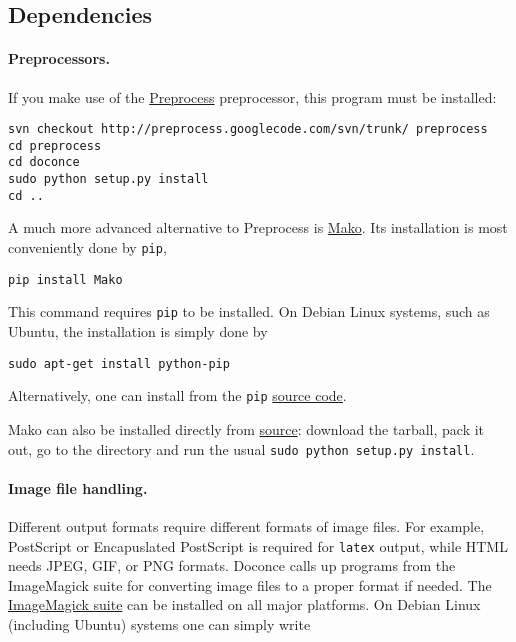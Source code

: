 \documentclass[%
oneside,                 %
final,                   %
10pt]{article}
\begin{document}
\subsection{Dependencies}

\paragraph{Preprocessors.}
If you make use of the \href{{http://code.google.com/p/preprocess}}{Preprocess}
preprocessor, this program must be installed:

\vspace{4pt}
\begin{Verbatim}[numbers=none,frame=lines,label=\fbox{{\tiny Terminal}},fontsize=\fontsize{9pt}{9pt},
labelposition=topline,framesep=2.5mm,framerule=0.7pt]
svn checkout http://preprocess.googlecode.com/svn/trunk/ preprocess
cd preprocess
cd doconce
sudo python setup.py install
cd ..
\end{Verbatim}

A much more advanced alternative to Preprocess is
\href{{http://www.makotemplates.org}}{Mako}. Its installation is most
conveniently done by {\fontsize{10pt}{10pt}\Verb!pip!},

\vspace{4pt}
\begin{Verbatim}[numbers=none,frame=lines,label=\fbox{{\tiny Terminal}},fontsize=\fontsize{9pt}{9pt},
labelposition=topline,framesep=2.5mm,framerule=0.7pt]
pip install Mako
\end{Verbatim}
This command requires {\fontsize{10pt}{10pt}\Verb!pip!} to be installed. On Debian Linux systems,
such as Ubuntu, the installation is simply done by

\vspace{4pt}
\begin{Verbatim}[numbers=none,frame=lines,label=\fbox{{\tiny Terminal}},fontsize=\fontsize{9pt}{9pt},
labelposition=topline,framesep=2.5mm,framerule=0.7pt]
sudo apt-get install python-pip
\end{Verbatim}
Alternatively, one can install from the {\fontsize{10pt}{10pt}\Verb!pip!} \href{{http://pypi.python.org/pypi/pip}}{source code}.

Mako can also be installed directly from
\href{{http://www.makotemplates.org/download.html}}{source}: download the
tarball, pack it out, go to the directory and run
the usual {\fontsize{10pt}{10pt}\Verb!sudo python setup.py install!}.

\paragraph{Image file handling.}
Different output formats require different formats of image files.
For example, PostScript or Encapuslated PostScript is required for {\fontsize{10pt}{10pt}\Verb!latex!}
output, while HTML needs JPEG, GIF, or PNG formats.
Doconce calls up programs from the ImageMagick suite for converting
image files to a proper format if needed. The \href{{http://www.imagemagick.org/script/index.php}}{ImageMagick suite} can be installed on all major platforms.
On Debian Linux (including Ubuntu) systems one can simply write
\end{document}
